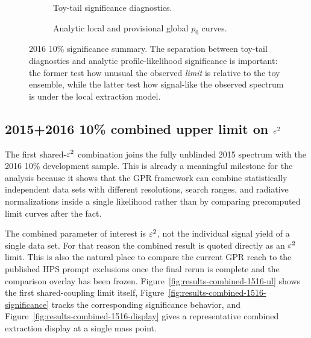 \begin{figure}[H]
\centering
\begin{subfigure}[t]{0.48\linewidth}
  \centering
  \caption{Toy-tail significance diagnostics.}
\end{subfigure}
\hfill
\begin{subfigure}[t]{0.48\linewidth}
  \centering
  \caption{Analytic local and provisional global $p_0$ curves.}
\end{subfigure}
\caption{2016 10\% significance summary. The separation between toy-tail
diagnostics and analytic profile-likelihood significance is important: the former test
how unusual the observed \emph{limit} is relative to the toy ensemble, while the latter
test how signal-like the observed spectrum is under the local extraction model.}
\label{fig:results-2016-significance}
\end{figure}

\subsection{2015+2016 10\% combined upper limit on \texorpdfstring{$\varepsilon^2$}{epsilon2}}
\label{sec:results-combined-1516}

The first shared-$\varepsilon^2$ combination joins the fully unblinded 2015 spectrum with the
2016 10\% development sample. This is already a meaningful milestone for the analysis
because it shows that the GPR framework can combine statistically independent data sets
with different resolutions, search ranges, and radiative normalizations inside a single
likelihood rather than by comparing precomputed limit curves after the fact.

The combined parameter of interest is $\varepsilon^2$, not the individual signal yield of a
single data set. For that reason the combined result is quoted directly as an
$\varepsilon^2$ limit. This is also the natural place to compare the current GPR reach to the
published HPS prompt exclusions once the final rerun is complete and the comparison
overlay has been frozen. Figure~\ref{fig:results-combined-1516-ul} shows the first
shared-coupling limit itself, Figure~\ref{fig:results-combined-1516-significance}
tracks the corresponding significance behavior, and
Figure~\ref{fig:results-combined-1516-display} gives a representative combined
extraction display at a single mass point.

